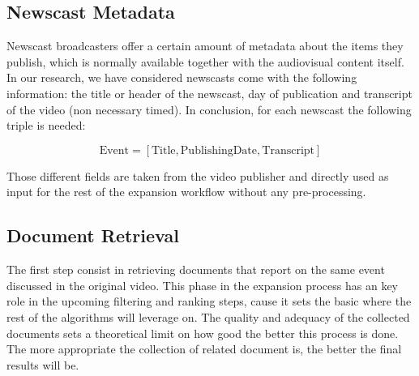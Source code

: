 \documentclass{llncs}
\begin{document}
\subsection{Newscast Metadata}

Newscast broadcasters offer a certain amount of metadata about the items they publish, which is normally available together with the audiovisual content itself. In our research, we have considered newscasts come with the following information: the title or header of the newscast, day of publication and transcript of the video (non necessary timed). In conclusion, for each newscast the following triple is needed:

\begin{equation}
\text{Event} =\left [ \text{Title}, \text{PublishingDate}, \text{Transcript} \right ]
\end{equation}

Those different fields are taken from the video publisher and directly used as input for the rest of the expansion workflow without any pre-processing.

\subsection{Document Retrieval}
The first step consist in retrieving documents that report on the same event discussed in the original video. This phase in the expansion process has an key role in the upcoming filtering and ranking steps, cause it sets the basic where the rest of the algorithms will leverage on. The quality and adequacy of the collected documents sets a theoretical limit on how good the better this process is done. The more appropriate the collection of related document is, the better the final results will be.
\end{document}
